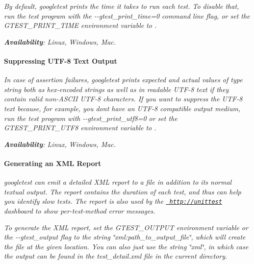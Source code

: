 {\itshape }

{\itshape By default, googletest prints the time it takes to run each test. To disable that, run the test program with the {\ttfamily -\/-\/gtest\+\_\+print\+\_\+time=0} command line flag, or set the G\+T\+E\+S\+T\+\_\+\+P\+R\+I\+N\+T\+\_\+\+T\+I\+ME environment variable to {}.}

{\itshape {\bfseries{Availability}}\+: Linux, Windows, Mac.}

{\itshape \paragraph*{Suppressing U\+T\+F-\/8 Text Output}}

{\itshape }

{\itshape In case of assertion failures, googletest prints expected and actual values of type {\ttfamily string} both as hex-\/encoded strings as well as in readable U\+T\+F-\/8 text if they contain valid non-\/\+A\+S\+C\+II U\+T\+F-\/8 characters. If you want to suppress the U\+T\+F-\/8 text because, for example, you don\textquotesingle{}t have an U\+T\+F-\/8 compatible output medium, run the test program with {\ttfamily -\/-\/gtest\+\_\+print\+\_\+utf8=0} or set the {\ttfamily G\+T\+E\+S\+T\+\_\+\+P\+R\+I\+N\+T\+\_\+\+U\+T\+F8} environment variable to {}.}

{\itshape {\bfseries{Availability}}\+: Linux, Windows, Mac.}

{\itshape \paragraph*{Generating an X\+ML Report}}

{\itshape }

{\itshape googletest can emit a detailed X\+ML report to a file in addition to its normal textual output. The report contains the duration of each test, and thus can help you identify slow tests. The report is also used by the \href{http://unittest}{\texttt{ http\+://unittest}} dashboard to show per-\/test-\/method error messages.}

{\itshape To generate the X\+ML report, set the {\ttfamily G\+T\+E\+S\+T\+\_\+\+O\+U\+T\+P\+UT} environment variable or the {\ttfamily -\/-\/gtest\+\_\+output} flag to the string {\ttfamily \char`\"{}xml\+:path\+\_\+to\+\_\+output\+\_\+file\char`\"{}}, which will create the file at the given location. You can also just use the string {\ttfamily \char`\"{}xml\char`\"{}}, in which case the output can be found in the {\ttfamily test\+\_\+detail.\+xml} file in the current directory.}


